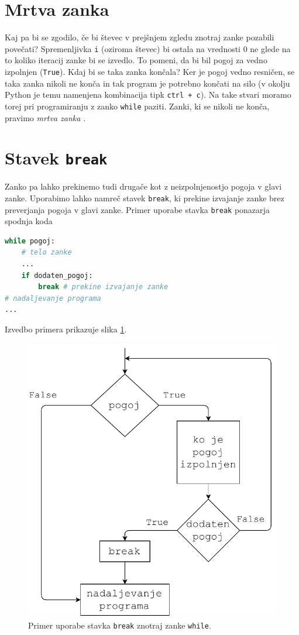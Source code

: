 \section{Mrtva zanka}

Kaj pa bi se zgodilo, če bi števec v prejšnjem zgledu znotraj zanke pozabili povečati? Spremenljivka \texttt{i} (oziroma števec) bi ostala na vrednosti 0 ne glede na to koliko iteracij zanke bi se izvedlo. To pomeni, da bi bil pogoj za vedno izpolnjen (\texttt{True}). Kdaj bi se taka zanka končala? Ker je pogoj vedno resničen, se taka zanka nikoli ne konča in tak program je potrebno končati na silo (v okolju Python je temu namenjena kombinacija tipk \texttt{ctrl + c}). Na take stvari moramo torej pri programiranju z zanko \texttt{while} paziti. Zanki, ki se nikoli ne konča, pravimo \emph{mrtva zanka} .

\section{Stavek \texttt{break}}
Zanko pa lahko prekinemo tudi drugače kot z neizpolnjenostjo pogoja v glavi zanke. Uporabimo lahko namreč stavek \texttt{break}, ki prekine izvajanje zanke brez preverjanja pogoja v glavi zanke. Primer uporabe stavka \texttt{break} ponazarja spodnja koda
\begin{lstlisting}[language=Python, showstringspaces=false]
while pogoj:
    # telo zanke
    ...
    if dodaten_pogoj: 
        break # prekine izvajanje zanke
# nadaljevanje programa
...
\end{lstlisting}
Izvedbo primera prikazuje slika \ref{img:while2}. 
\begin{figure}
    \centering
    \includegraphics[width=0.5\linewidth]{img/while2.pdf}
    \caption{Primer uporabe stavka \texttt{break} znotraj zanke \texttt{while}.}
    \label{img:while2}
\end{figure}

